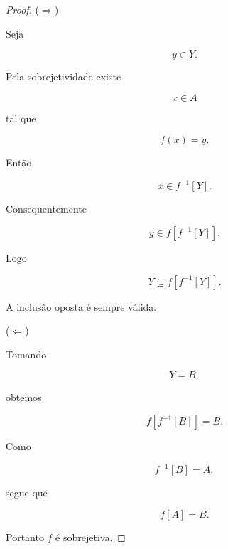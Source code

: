 \documentclass[../../main]{subfiles}
\begin{document}
\begin{proof}

	(\(\Rightarrow\))

	Seja

	\[
		y\in Y.
	\]

	Pela sobrejetividade existe

	\[
		x\in A
	\]

	tal que

	\[
		f(x)=y.
	\]

	Então

	\[
		x\in f^{-1}[Y].
	\]

	Consequentemente

	\[
		y\in f[f^{-1}[Y]].
	\]

	Logo

	\[
		Y
		\subseteq
		f[f^{-1}[Y]].
	\]

	A inclusão oposta é sempre válida.

	(\(\Leftarrow\))

	Tomando

	\[
		Y=B,
	\]

	obtemos

	\[
		f[f^{-1}[B]]
		=
		B.
	\]

	Como

	\[
		f^{-1}[B]=A,
	\]

	segue que

	\[
		f[A]=B.
	\]

	Portanto \(f\) é sobrejetiva.

\end{proof}
\end{document}
